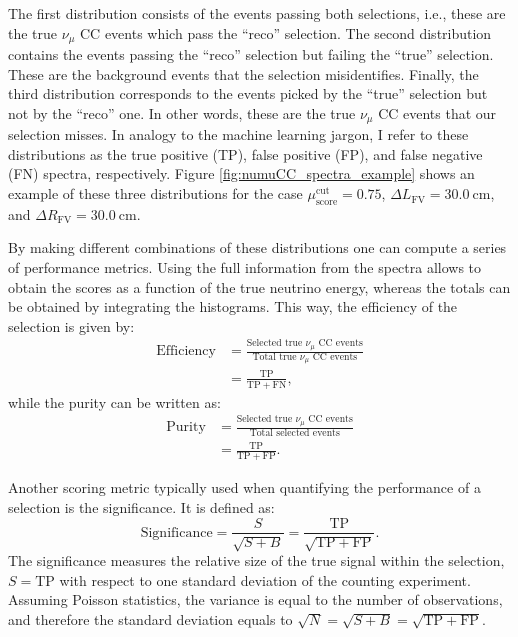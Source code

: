 The first distribution consists of the events passing both selections, i.e., these are the true $\nu_{\mu}$ CC events which pass the ``reco'' selection. The second distribution contains the events passing the ``reco'' selection but failing the ``true'' selection. These are the background events that the selection misidentifies. Finally, the third distribution corresponds to the events picked by the ``true'' selection but not by the ``reco'' one. In other words, these are the true $\nu_{\mu}$ CC events that our selection misses. In analogy to the machine learning jargon, I refer to these distributions as the true positive (TP), false positive (FP), and false negative (FN) spectra, respectively. Figure \ref{fig:numuCC_spectra_example} shows an example of these three distributions for the case $\mu_{\mathrm{score}}^{\mathrm{cut}} = 0.75$, $\Delta L_{\mathrm{FV}} = 30.0 ~ \mathrm{cm}$, and $\Delta R_{\mathrm{FV}} = 30.0 ~ \mathrm{cm}$.

By making different combinations of these distributions one can compute a series of performance metrics. Using the full information from the spectra allows to obtain the scores as a function of the true neutrino energy, whereas the totals can be obtained by integrating the histograms. This way, the efficiency of the selection is given by:
\begin{equation}
    \begin{split}
        \mathrm{Efficiency} &= \frac{\text{Selected true } \nu_{\mu} \text{ CC events}}{\text{Total true } \nu_{\mu} \text{ CC events}}\\
        &= \frac{\mathrm{TP}}{\mathrm{TP}+\mathrm{FN}},
    \end{split}
\end{equation}
while the purity can be written as:
\begin{equation}
    \begin{split}
        \mathrm{Purity} &= \frac{\text{Selected true } \nu_{\mu} \text{ CC events}}{\text{Total selected events}}\\
        &= \frac{\mathrm{TP}}{\mathrm{TP}+\mathrm{FP}}.
    \end{split}
\end{equation}

Another scoring metric typically used when quantifying the performance of a selection is the significance. It is defined as:
\begin{equation}
    \mathrm{Significance} = \frac{S}{\sqrt{S+B}} = \frac{\mathrm{TP}}{\sqrt{\mathrm{TP} + \mathrm{FP}}}.
\end{equation}
The significance measures the relative size of the true signal within the selection, $S=\mathrm{TP}$ with respect to one standard deviation of the counting experiment. Assuming Poisson statistics, the variance is equal to the number of observations, and therefore the standard deviation equals to $\sqrt{N}=\sqrt{S+B}=\sqrt{\mathrm{TP} + \mathrm{FP}}$.

